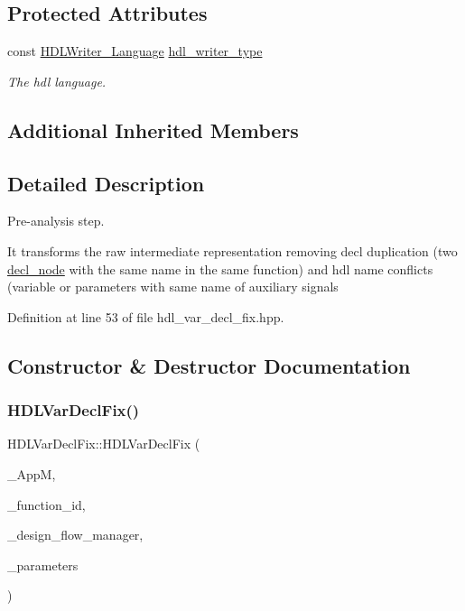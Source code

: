 \subsection*{Protected Attributes}
\begin{DoxyCompactItemize}
\item 
const \hyperlink{language__writer_8hpp_a890069761ca3ce361c42684c789d886c}{H\+D\+L\+Writer\+\_\+\+Language} \hyperlink{classHDLVarDeclFix_ae5d27057634b5611bedd28601eefe585}{hdl\+\_\+writer\+\_\+type}
\begin{DoxyCompactList}\small\item\em The hdl language. \end{DoxyCompactList}\end{DoxyCompactItemize}
\subsection*{Additional Inherited Members}


\subsection{Detailed Description}
Pre-\/analysis step. 

It transforms the raw intermediate representation removing decl duplication (two \hyperlink{structdecl__node}{decl\+\_\+node} with the same name in the same function) and hdl name conflicts (variable or parameters with same name of auxiliary signals 

Definition at line 53 of file hdl\+\_\+var\+\_\+decl\+\_\+fix.\+hpp.



\subsection{Constructor \& Destructor Documentation}
\mbox{\label{classHDLVarDeclFix_aeea592f33dad08dbeaf49e67b1de5652}} 
\subsubsection{\texorpdfstring{H\+D\+L\+Var\+Decl\+Fix()}{HDLVarDeclFix()}}
{\footnotesize\ttfamily H\+D\+L\+Var\+Decl\+Fix\+::\+H\+D\+L\+Var\+Decl\+Fix (\begin{DoxyParamCaption}\item[{const \hyperlink{application__manager_8hpp_a04ccad4e5ee401e8934306672082c180}{application\+\_\+manager\+Ref}}]{\+\_\+\+AppM,  }\item[{unsigned int}]{\+\_\+function\+\_\+id,  }\item[{const Design\+Flow\+Manager\+Const\+Ref}]{\+\_\+design\+\_\+flow\+\_\+manager,  }\item[{const \hyperlink{Parameter_8hpp_a37841774a6fcb479b597fdf8955eb4ea}{Parameter\+Const\+Ref}}]{\+\_\+parameters }\end{DoxyParamCaption})}



